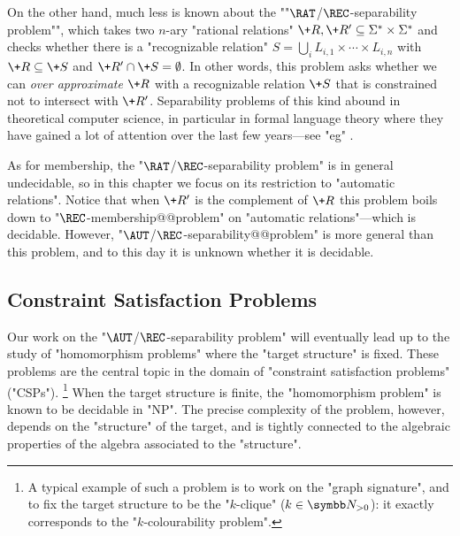 \AP On the other hand, much less is known about the ""$\RAT$/$\REC$-separability problem"", which takes two $n$-ary "rational relations" 
$\+R,\+R' \subseteq \Sigma^* \times \Sigma^*$ and checks whether there is a "recognizable relation" 
$S = \bigcup_i L_{i,1} \times \cdots \times L_{i,n}$
with $\+R \subseteq \+S$ and $\+R' \cap \+S = \emptyset$. In other words, this problem asks whether we can \emph{over approximate} $\+R$ with a recognizable 
relation $\+S$ that is constrained not to intersect with $\+R'$. Separability problems of this kind abound in theoretical computer science, in particular
in formal language theory where they have gained a lot of attention over the last few years---see "eg" \cite{PlaceZeitoun2016SeparatingRegularLanguages,Kopczynski2016InvisiblePushdownLanguages,CzerwinskiMartensRooijenZeitounZetzsche2017DecidableSeparabilityPiecewiseTestable,ClementeCzerwinskiLasotaPaperman2017RegularSeparabilityParikhAutomata}. 

As for membership, the "$\RAT$/$\REC$-separability problem"
is in general undecidable, so in this chapter we focus on its restriction to
"automatic relations".
Notice that when $\+R'$ is the complement of $\+R$ this problem boils down to "$\REC$-membership@@problem" on "automatic relations"---which is decidable. 
However, "$\AUT$/$\REC$-separability@@problem" is more general than this problem,
and to this day it is unknown whether it is decidable. 


\subsection{Constraint Satisfaction Problems}

Our work on the "$\AUT$/$\REC$-separability problem" will eventually lead up to
the study of "homomorphism problems" where the "target structure" is fixed.
These problems are the central topic in the domain of "constraint satisfaction problems" ("CSPs").%
\footnote{A typical example of such a problem is to work on the "graph signature", and to fix the
target structure to be the "$k$-clique" ($k \in \Np$): it exactly corresponds to
the "$k$-colourability problem".}
When the target structure is finite, the "homomorphism problem" is known to be decidable
in "NP". The precise complexity of the problem, however, depends on the "structure" of the target,
and is tightly connected to the algebraic properties of the algebra associated to the
"structure".

